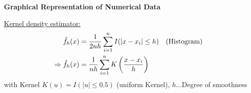 \documentclass[10pt,landscape,a4paper]{article}
\begin{document}
\raggedright
\footnotesize
\begin{multicols*}{4}


\setlength{\columnseprule}{0.1pt}
\setlength{\premulticols}{1pt}
\setlength{\postmulticols}{1pt}
\setlength{\multicolsep}{1pt}
\setlength{\columnsep}{1pt}

\begin{center}
	\normalsize{\textbf{Graphical Representation of Numerical Data}} \\
\end{center}
\underline{Kernel density estimator:}
\begin{align}
	\hat{f}_h(x) &= \frac{1}{2nh}\sum_{i=1}^{n}I(\vert x-x_i\vert\le h) \quad\text{(Histogram)} \notag \\
	\Rightarrow\hat{f}_h(x) &= \frac{1}{nh}\sum_{i=1}^n K\left(\frac{x-x_i}{h}\right) \notag
\end{align}
with Kernel $K(u) = I(\vert u\vert \le 0.5)$ (uniform Kernel), $h$...Degree of smoothness


\end{multicols*}
\end{document}
